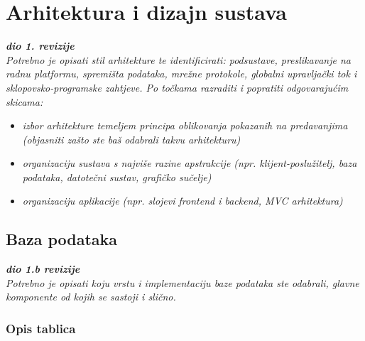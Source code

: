 \chapter{Arhitektura i dizajn sustava}
		
		\textbf{\textit{dio 1. revizije}}\\

		\textit{ Potrebno je opisati stil arhitekture te identificirati: podsustave, preslikavanje na radnu platformu, spremišta podataka, mrežne protokole, globalni upravljački tok i sklopovsko-programske zahtjeve. Po točkama razraditi i popratiti odgovarajućim skicama:}
	\begin{itemize}
		\item 	\textit{izbor arhitekture temeljem principa oblikovanja pokazanih na predavanjima (objasniti zašto ste baš odabrali takvu arhitekturu)}
		\item 	\textit{organizaciju sustava s najviše razine apstrakcije (npr. klijent-poslužitelj, baza podataka, datotečni sustav, grafičko sučelje)}
		\item 	\textit{organizaciju aplikacije (npr. slojevi frontend i backend, MVC arhitektura) }		
	\end{itemize}

	
		

		

				
		\section{Baza podataka}
			
			\textbf{\textit{dio 1.b revizije}}\\
			
		\textit{Potrebno je opisati koju vrstu i implementaciju baze podataka ste odabrali, glavne komponente od kojih se sastoji i slično.}
		
			\subsection{Opis tablica}


